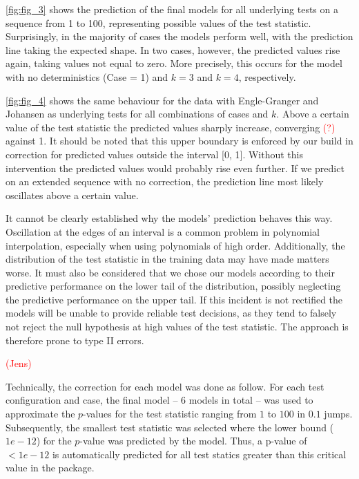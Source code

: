 \documentclass[12pt,a4paper]{article}
\begin{document}
\ref{fig:fig_3} shows the prediction of the final models for all
underlying tests on a sequence from 1 to 100, representing possible
values of the test statistic. Surprisingly, in the majority of cases the
models perform well, with the prediction line taking the expected shape.
In two cases, however, the predicted values rise again, taking values
not equal to zero. More precisely, this occurs for the model with no
deterministics (Case = 1) and \(k = 3\) and \(k = 4\), respectively.

\ref{fig:fig_4} shows the same behaviour for the data with Engle-Granger
and Johansen as underlying tests for all combinations of cases and
\(k\). Above a certain value of the test statistic the predicted values
sharply increase, converging \textcolor{red}{(?)} against 1. It should
be noted that this upper boundary is enforced by our build in correction
for predicted values outside the interval {[}0, 1{]}. Without this
intervention the predicted values would probably rise even further. If
we predict on an extended sequence with no correction, the prediction
line most likely oscillates above a certain value.

It cannot be clearly established why the models' prediction behaves this
way. Oscillation at the edges of an interval is a common problem in
polynomial interpolation, especially when using polynomials of high
order. Additionally, the distribution of the test statistic in the
training data may have made matters worse. It must also be considered
that we chose our models according to their predictive performance on
the lower tail of the distribution, possibly neglecting the predictive
performance on the upper tail. If this incident is not rectified the
models will be unable to provide reliable test decisions, as they tend
to falsely not reject the null hypothesis at high values of the test
statistic. The approach is therefore prone to type II errors.

\textcolor{red}{(Jens)}

Technically, the correction for each model was done as follow. For each
test configuration and case, the final model -- 6 models in total -- was
used to approximate the \(p\)-values for the test statistic ranging from
\(1\) to \(100\) in \(0.1\) jumps. Subsequently, the smallest test
statistic was selected where the lower bound (\(1e-12\)) for the
\(p\)-value was predicted by the model. Thus, a p-value of \(< 1e-12\)
is automatically predicted for all test statics greater than this
critical value in the package.
\end{document}
